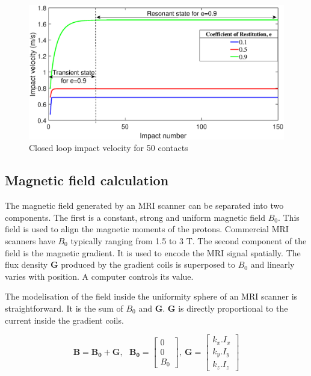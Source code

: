 \documentclass[letterpaper, 10 pt, conference]{ieeeconf}  %
\begin{document}
\begin{figure}
	\includegraphics[width=\linewidth]{Closedloop_Impact_velocity.eps}
	\caption{Closed loop impact velocity for 50 contacts}
	\label{Closedloop_Impact_velocity}
\end{figure}

\subsection{Magnetic field calculation}

The magnetic field generated by an MRI scanner can be separated into two components. The first is a constant, strong and uniform magnetic field $B_0$. This field is used to align the magnetic moments of the protons. Commercial MRI scanners have $B_0$ typically ranging from 1.5 to 3 T. The second component of the field is the magnetic gradient. It is used to encode the MRI signal spatially. The flux density $\mathbf{G}$ produced by the gradient coils is superposed to $B_0$ and linearly varies with position. A computer controls its value.\par
The modelisation of the field inside the uniformity sphere of an MRI scanner is straightforward. It is the sum of $B_0$ and $\mathbf{G}$. $\mathbf{G}$ is directly proportional to the current inside the gradient coils.

\begin{equation}
\mathbf{B}=\mathbf{B_0}+\mathbf{G},~~~
\mathbf{B_0}=\begin{bmatrix}
0\\ 
0\\ 
B_0
\end{bmatrix},~
\mathbf{G}=\begin{bmatrix}
k_x.I_x\\ 
k_y.I_y\\ 
k_z.I_z
\end{bmatrix}
\end{equation}
\end{document}
